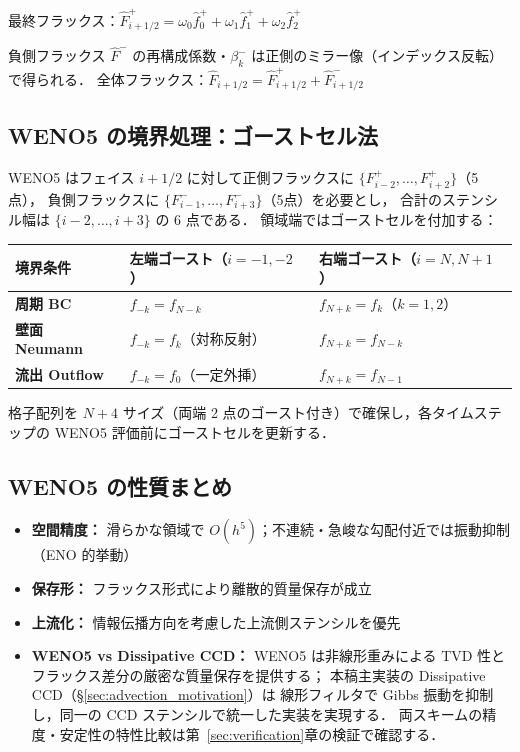 最終フラックス：$\hat{F}^+_{i+1/2} = \omega_0\hat{f}^+_0 + \omega_1\hat{f}^+_1 + \omega_2\hat{f}^+_2$

負側フラックス $\hat{F}^-$ の再構成係数・$\beta_k^-$ は正側のミラー像（インデックス反転）で得られる．
全体フラックス：$\hat{F}_{i+1/2} = \hat{F}^+_{i+1/2} + \hat{F}^-_{i+1/2}$

\subsection{WENO5 の境界処理：ゴーストセル法}
\label{app:weno5_boundary}

WENO5 はフェイス $i+1/2$ に対して正側フラックスに $\{F^+_{i-2},\ldots,F^+_{i+2}\}$（5点），
負側フラックスに $\{F^-_{i-1},\ldots,F^-_{i+3}\}$（5点）を必要とし，
合計のステンシル幅は $\{i-2,\ldots,i+3\}$ の 6 点である．
領域端ではゴーストセルを付加する：

\begin{tcolorbox}[algbox, title={ゴーストセルによる境界ステンシル処理（本稿採用方針）}]
\begin{center}
\renewcommand{\arraystretch}{1.3}
\begin{tabular}{lll}
\hline
境界条件 & 左端ゴースト（$i=-1,-2$） & 右端ゴースト（$i=N,N+1$） \\
\hline
\textbf{周期 BC} & $f_{-k} = f_{N-k}$ & $f_{N+k} = f_k$（$k=1,2$） \\
\textbf{壁面 Neumann} & $f_{-k} = f_{k}$（対称反射） & $f_{N+k} = f_{N-k}$ \\
\textbf{流出 Outflow} & $f_{-k} = f_0$（一定外挿） & $f_{N+k} = f_{N-1}$ \\
\hline
\end{tabular}
\end{center}
格子配列を $N+4$ サイズ（両端 2 点のゴースト付き）で確保し，各タイムステップの WENO5 評価前にゴーストセルを更新する．
\end{tcolorbox}

\subsection{WENO5 の性質まとめ}
\label{app:weno5_summary}

\begin{itemize}
  \item \textbf{空間精度：} 滑らかな領域で $O(h^5)$；不連続・急峻な勾配付近では振動抑制（ENO 的挙動）
  \item \textbf{保存形：} フラックス形式により離散的質量保存が成立
  \item \textbf{上流化：} 情報伝播方向を考慮した上流側ステンシルを優先
  \item \textbf{WENO5 vs Dissipative CCD：} WENO5 は非線形重みによる TVD 性と
        フラックス差分の厳密な質量保存を提供する；
        本稿主実装の Dissipative CCD（§\ref{sec:advection_motivation}）は
        線形フィルタで Gibbs 振動を抑制し，同一の CCD ステンシルで統一した実装を実現する．
        両スキームの精度・安定性の特性比較は第~\ref{sec:verification}章の検証で確認する．
\end{itemize}
